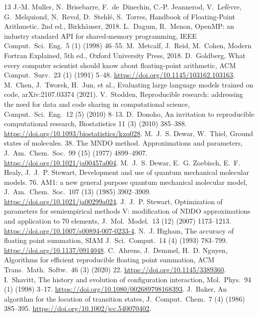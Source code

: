 \documentclass[preprint,12pt]{elsarticle}
\begin{document}
\begin{thebibliography}{13}
 J.-M. Muller, N.~Brisebarre, F.~de~Dinechin, C.-P. Jeannerod, V.~Lef\`evre, G.~Melquiond, N.~Revol, D.~Stehl\'e, S.~Torres, Handbook of Floating-Point Arithmetic, 2nd ed., Birkh\"auser, 2018.
 L.~Dagum, R.~Menon, OpenMP: an industry standard API for shared-memory programming, IEEE Comput.\ Sci.\ Eng.\ 5 (1) (1998) 46--55.
 M.~Metcalf, J.~Reid, M.~Cohen, Modern Fortran Explained, 5th ed., Oxford University Press, 2018.
 D.~Goldberg, What every computer scientist should know about floating-point arithmetic, ACM Comput.\ Surv.\ 23 (1) (1991) 5--48. \url{https://doi.org/10.1145/103162.103163}.
 M.~Chen, J.~Tworek, H.~Jun, et al., Evaluating large language models trained on code, arXiv:2107.03374 (2021).
 V.~Stodden, Reproducible research: addressing the need for data and code sharing in computational science, Comput.\ Sci.\ Eng.\ 12 (5) (2010) 8--13.
 D.~Donoho, An invitation to reproducible computational research, Biostatistics 11 (3) (2010) 385--388. \url{https://doi.org/10.1093/biostatistics/kxq028}.
 M.~J.~S. Dewar, W.~Thiel, Ground states of molecules. 38. The MNDO method. Approximations and parameters, J.\ Am.\ Chem.\ Soc.\ 99 (15) (1977) 4899--4907. \url{https://doi.org/10.1021/ja00457a004}.
 M.~J.~S. Dewar, E.~G. Zoebisch, E.~F. Healy, J.~J.~P. Stewart, Development and use of quantum mechanical molecular models. 76. AM1: a new general purpose quantum mechanical molecular model, J.\ Am.\ Chem.\ Soc.\ 107 (13) (1985) 3902--3909. \url{https://doi.org/10.1021/ja00299a024}.
 J.~J.~P. Stewart, Optimization of parameters for semiempirical methods V: modification of NDDO approximations and application to 70 elements, J.\ Mol.\ Model.\ 13 (12) (2007) 1173--1213. \url{https://doi.org/10.1007/s00894-007-0233-4}.
 N.~J. Higham, The accuracy of floating point summation, SIAM J.\ Sci.\ Comput.\ 14 (4) (1993) 783--799. \url{https://doi.org/10.1137/0914048}.
 C.~Ahrens, J.~Demmel, H.~D. Nguyen, Algorithms for efficient reproducible floating point summation, ACM Trans.\ Math.\ Softw.\ 46 (3) (2020) 22. \url{https://doi.org/10.1145/3389360}.
 I.~Shavitt, The history and evolution of configuration interaction, Mol.\ Phys.\ 94 (1) (1998) 3--17. \url{https://doi.org/10.1080/002689798168393}.
 J.~Baker, An algorithm for the location of transition states, J.\ Comput.\ Chem.\ 7 (4) (1986) 385--395. \url{https://doi.org/10.1002/jcc.540070402}.

\end{thebibliography}
\end{document}
